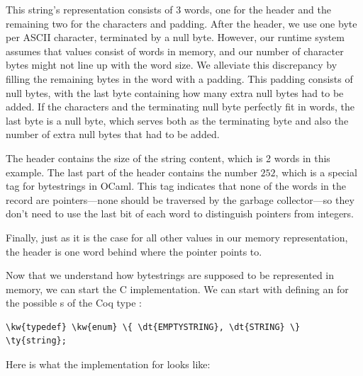 This string's representation consists of 3 words, one for the header and the remaining two for the characters and padding. After the header, we use one byte per ASCII character, terminated by a null byte. However, our runtime system assumes that values consist of words in memory, and our number of character bytes might not line up with the word size. We alleviate this discrepancy by filling the remaining bytes in the word with a padding. This padding consists of null bytes, with the last byte containing how many extra null bytes had to be added. If the characters and the terminating null byte perfectly fit in words, the last byte is a null byte, which serves both as the terminating byte and also the number of extra null bytes that had to be added.

The header contains the size of the string content, which is 2 words in this example. The last part of the header contains the number $252$, which is a special tag for bytestrings in OCaml. This tag indicates that none of the words in the record are pointers---none should be traversed by the garbage collector---so they don't need to use the last bit of each word to distinguish pointers from integers.

Finally, just as it is the case for all other values in our memory representation, the header is one word behind where the pointer points to.

Now that we understand how bytestrings are supposed to be represented in memory, we can start the C implementation.
We can start with defining an  for the possible \constructor{}s of the Coq type :

\begin{Verbatim}
\kw{typedef} \kw{enum} \{ \dt{EMPTYSTRING}, \dt{STRING} \} \ty{string};
\end{Verbatim}

Here is what the implementation for  looks like:

